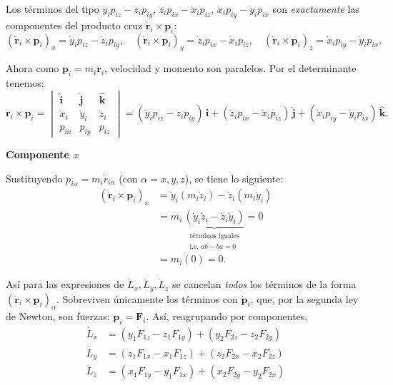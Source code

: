 \documentclass{article}
\begin{document}
Los términos del tipo
\(\dot{y}_i p_{iz} - \dot{z}_i p_{iy}\), \(\dot{z}_i p_{ix} - \dot{x}_i p_{iz}\), 
\(\dot{x}_i p_{iy} - \dot{y}_i p_{ix}\) son \emph{exactamente} las componentes del producto cruz 
\(\dot{\boldsymbol r}_i \times \boldsymbol p_i\):
\[
(\dot{\boldsymbol r}_i \times \boldsymbol p_i)_x=\dot y_i p_{iz}-\dot z_i p_{iy},\quad
(\dot{\boldsymbol r}_i \times \boldsymbol p_i)_y=\dot z_i p_{ix}-\dot x_i p_{iz},\quad
(\dot{\boldsymbol r}_i \times \boldsymbol p_i)_z=\dot x_i p_{iy}-\dot y_i p_{ix}.
\]

Ahora como \(\boldsymbol p_i = m_i \dot{\boldsymbol r}_i\), velocidad y momento son paralelos. 
Por el determinante tenemos:
\[
\dot{\boldsymbol r}_i \times \boldsymbol p_i =
\begin{vmatrix}
\hat{\boldsymbol i} & \hat{\boldsymbol j} & \hat{\boldsymbol k}\\
\dot x_i & \dot y_i & \dot z_i\\
p_{ix} & p_{iy} & p_{iz}
\end{vmatrix}
=
(\dot y_i p_{iz}-\dot z_i p_{iy})\,\hat{\boldsymbol i}
+(\dot z_i p_{ix}-\dot x_i p_{iz})\,\hat{\boldsymbol j}
+(\dot x_i p_{iy}-\dot y_i p_{ix})\,\hat{\boldsymbol k}.
\]

\textbf{Componente $x$}

Sustituyendo \(p_{i\alpha}=m_i \dot r_{i\alpha}\) (con \(\alpha=x,y,z\)), se tiene lo siguiente:
\[
\begin{aligned}
(\dot{\boldsymbol r}_i \times \boldsymbol p_i)_x
&= \dot y_i (m_i \dot z_i) - \dot z_i (m_i \dot y_i) \\[4pt]
&= m_i\,\underbrace{(\dot y_i \dot z_i - \dot z_i \dot y_i)}_{\substack{\text{t\'erminos iguales}\\ \text{i.e. } ab - ba=0}} = 0\\
&= m_i(0) = 0.
\end{aligned}
\]

Así para las expresiones de \(\dot{L}_x,\dot{L}_y,\dot{L}_z\) se cancelan \emph{todos} los términos de la forma 
\((\dot{\boldsymbol r}_i \times \boldsymbol p_i)_\alpha\). 
Sobreviven únicamente los términos con \(\dot{\boldsymbol p}_i\), que, por la segunda ley de Newton, 
son fuerzas: \(\dot{\boldsymbol p}_i=\boldsymbol F_i\). 
Así, reagrupando por componentes,
\[
\boxed{
\begin{aligned}
\dot{L}_x &= (y_1F_{1z}-z_1F_{1y})+(y_2F_{2z}-z_2F_{2y})\\[2pt]
\dot{L}_y &= (z_1F_{1x}-x_1F_{1z})+(z_2F_{2x}-x_2F_{2z})\\[2pt]
\dot{L}_z &= (x_1F_{1y}-y_1F_{1x})+(x_2F_{2y}-y_2F_{2x})
\end{aligned}
}
\]
\end{document}
